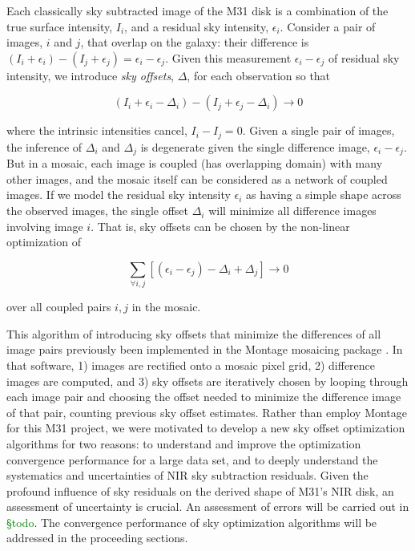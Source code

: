 \documentclass[iop]{emulateapj}
\newcommand{\todo}[1]{\textcolor{green}{#1}}
\begin{document}
Each classically sky subtracted image of the M31 disk is a combination of the true surface intensity, $I_i$, and a residual sky intensity, $\epsilon_i$. Consider a pair of images, $i$ and $j$, that overlap on the galaxy: their difference is $(I_i+\epsilon_i) - (I_j+\epsilon_j) = \epsilon_i - \epsilon_j$. Given this measurement $\epsilon_i - \epsilon_j$ of residual sky intensity, we introduce \emph{sky offsets}, $\Delta$, for each observation so that

\begin{equation}
    (I_i + \epsilon_i - \Delta_i) - (I_j + \epsilon_j - \Delta_i) \rightarrow 0
\end{equation}

\noindent where the intrinsic intensities cancel, $I_i - I_j = 0$. Given a single pair of images, the inference of $\Delta_i$ and $\Delta_j$ is degenerate given the single difference image, $\epsilon_i-\epsilon_j$. But in a mosaic, each image is coupled (has overlapping domain) with many other images, and the mosaic itself can be considered as a network of coupled images. If we model the residual sky intensity $\epsilon_i$ as having a simple shape across the observed images, the single offset $\Delta_i$ will minimize all difference images involving image $i$. That is, sky offsets can be chosen by the non-linear optimization of

\begin{equation}
    \sum_{\forall i,j} [(\epsilon_i - \epsilon_j) - \Delta_i + \Delta_j] \rightarrow 0
    \label{eq:scalartheoryobj}
\end{equation}

\noindent over all coupled pairs $i,j$ in the mosaic.

This algorithm of introducing sky offsets that minimize the differences of all image pairs previously been implemented in the Montage mosaicing package \citep{Berriman:2008}. In that software, 1) images are rectified onto a mosaic pixel grid, 2) difference images are computed, and 3) sky offsets are iteratively chosen by looping through each image pair and choosing the offset needed to minimize the difference image of that pair, counting previous sky offset estimates. Rather than employ Montage for this M31 project, we were motivated to develop a new sky offset optimization algorithms for two reasons: to understand and improve the optimization convergence performance for a large data set, and to deeply understand the systematics and uncertainties of NIR sky subtraction residuals. Given the profound influence of sky residuals on the derived shape of M31's NIR disk, an assessment of uncertainty is crucial. An assessment of errors will be carried out in \todo{\S todo}. The convergence performance of sky optimization algorithms will be addressed in the proceeding sections.
\end{document}
